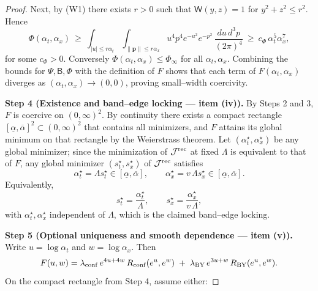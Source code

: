 \documentclass[10pt]{article}
\theoremstyle{definition}
\theoremstyle{plain}
\begin{document}
\begin{proof}
Next, by (W1) there exists $r>0$ such that $\mathsf W(y,z)=1$ for $y^2+z^2\le r^2$. Hence
\[
\Phi(\alpha_t,\alpha_x)\ \ge\ \int_{|u|\le r\alpha_t}\!\!\!\int_{\|\mathbf p\|\le r\alpha_x}
u^4 p^4 e^{-u^2}e^{-p^2}\,\frac{du\,d^3p}{(2\pi)^4}
\ \ge\ c_\Phi\,\alpha_t^{5}\alpha_x^{7},
\]
for some $c_\Phi>0$. Conversely $\Phi(\alpha_t,\alpha_x)\le \Phi_\infty$ for all $\alpha_t,\alpha_x$.
Combining the bounds for $\Psi,\mathsf B,\Phi$ with the definition of $F$ shows that each term of $F(\alpha_t,\alpha_x)$ diverges as $(\alpha_t,\alpha_x)\to(0,0)$, proving small–width coercivity.

\medskip
\noindent\textbf{Step 4 (Existence and band–edge locking — item (iv)).}
By Steps 2 and 3, $F$ is coercive on $(0,\infty)^2$. By continuity there exists a compact rectangle
$[\underline\alpha,\overline\alpha]^2\subset(0,\infty)^2$ that contains all minimizers, and $F$ attains its global minimum on that rectangle by the Weierstrass theorem. Let $(\alpha_t^\star,\alpha_x^\star)$ be any global minimizer; since the minimization of $\mathcal J^{\rm rec}$ at fixed $\Lambda$ is equivalent to that of $F$, any global minimizer $(s_t^\star,s_x^\star)$ of $\mathcal J^{\rm rec}$ satisfies
\[
\alpha_t^\star=\Lambda s_t^\star\in[\underline\alpha,\overline\alpha],\qquad
\alpha_x^\star=v\,\Lambda s_x^\star\in[\underline\alpha,\overline\alpha].
\]
Equivalently,
\[
s_t^\star=\frac{\alpha_t^\star}{\Lambda},\qquad s_x^\star=\frac{\alpha_x^\star}{v\,\Lambda},
\]
with $\alpha_t^\star,\alpha_x^\star$ independent of $\Lambda$, which is the claimed band–edge locking.

\medskip
\noindent\textbf{Step 5 (Optional uniqueness and smooth dependence — item (v)).}
Write $u=\log\alpha_t$ and $w=\log\alpha_x$. Then
\[
F(u,w)=\lambda_{\rm conf}\,e^{4u+4w}\,R_{\rm conf}(e^{u},e^{w})
\;+\;\lambda_{\rm BY}\,e^{3u+w}\,R_{\rm BY}(e^{u},e^{w}).
\]
On the compact rectangle from Step 4, assume either:


\end{proof}
\end{document}
